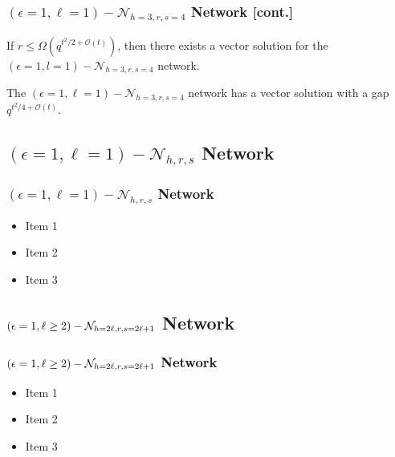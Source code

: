 \documentclass[c]{beamer}
\begin{document}
\begin{frame}[c]
\frametitle{$\left(\epsilon=1,\ell=1\right)-\mathcal{N}_{h=3,r,s=4}$ Network [cont.]}

	\begin{theorem}
If $r\leq\Omega\left(q^{t^{2}/2+\mathcal{O}\left(t\right)}\right)$,
then there exists a vector solution for the $\left(\epsilon=1,l=1\right)-\mathcal{N}_{h=3,r,s=4}$
network. \label{theo:r_for_vector_sol_e1l1h3rs4}
	\end{theorem}
	
	\begin{corollary}
	The $\left(\epsilon=1,\ell=1\right)-\mathcal{N}_{h=3,r,s=4}$ network
	has a vector solution with a gap $q^{t^{2}/4+\mathcal{O}(t)}$.
	\end{corollary}
\end{frame}

\subsection{$\left(\epsilon=1,\ell=1\right)-\mathcal{N}_{h,r,s}$ Network}
\begin{frame}[c]
\frametitle{$\left(\epsilon=1,\ell=1\right)-\mathcal{N}_{h,r,s}$ Network}

	\begin{itemize}
		\item Item 1
		\item Item 2
		\item Item 3
	\end{itemize}


\end{frame}

\subsection{$\left(\epsilon=1,\ell\protect\geq2\right)-\mathcal{N}_{h=2\ell,r,s=2\ell+1}$
Network}
\begin{frame}[c]
\frametitle{$\left(\epsilon=1,\ell\protect\geq2\right)-\mathcal{N}_{h=2\ell,r,s=2\ell+1}$
Network}

	\begin{itemize}
		\item Item 1
		\item Item 2
		\item Item 3
	\end{itemize}
\end{frame}
\end{document}
